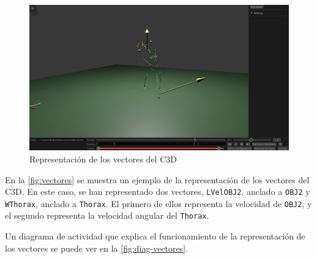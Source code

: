 \begin{figure}[H]
  \centering
  \includegraphics[width=\textwidth]{imagenes/vectores.png}
  \caption{Representación de los vectores del \acs{C3D}}
  \label{fig:vectores}
\end{figure}

En la \autoref{fig:vectores} se muestra un ejemplo de la representación de los vectores del \ac{C3D}. En este caso, se han representado dos vectores, \texttt{LVelOBJ2}, anclado a \texttt{OBJ2} y \texttt{WThorax}, anclado a \texttt{Thorax}. El primero de ellos representa la velocidad de \texttt{OBJ2}, y el segundo representa la velocidad angular del \texttt{Thorax}.

Un diagrama de actividad que explica el funcionamiento de la representación de los vectores se puede ver en la \autoref{fig:diag-vectores}.

